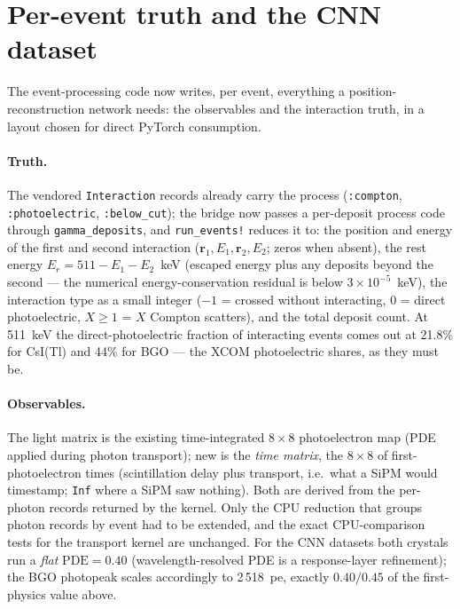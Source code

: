 \documentclass[11pt,a4paper]{article}
\newcommand{\code}[1]{\texttt{#1}}
\newcommand{\csitl}{CsI(Tl)}
\begin{document}
\section{Per-event truth and the CNN dataset}

The event-processing code now writes, per event, everything a position-reconstruction network
needs: the observables and the interaction truth, in a layout chosen for direct
PyTorch consumption.

\paragraph{Truth.} The vendored \code{Interaction} records already carry the process
(\code{:compton}, \code{:photoelectric}, \code{:below\_cut}); the bridge now passes a
per-deposit process code through \code{gamma\_deposits}, and \code{run\_events!}
reduces it to: the position and energy of the first and second interaction
($\mathbf{r}_1, E_1, \mathbf{r}_2, E_2$; zeros when absent), the rest energy
$E_r = 511 - E_1 - E_2$~keV (escaped energy plus any deposits beyond the second ---
the numerical energy-conservation residual is below $3\times10^{-5}$~keV), the interaction type as a small
integer ($-1$ = crossed without interacting, $0$ = direct photoelectric, $X \ge 1$ =
$X$ Compton scatters), and the total deposit count. At 511~keV the direct-photoelectric
fraction of interacting events comes out at 21.8\% for \csitl{} and 44\% for BGO ---
the XCOM photoelectric shares, as they must be.

\paragraph{Observables.} The light matrix is the existing time-integrated $8\times8$
photoelectron map (PDE applied during photon transport); new is the \emph{time matrix},
the $8\times8$ of first-photoelectron times (scintillation delay plus transport, i.e.\
what a SiPM would timestamp; \code{Inf} where a SiPM saw nothing). Both are derived
from the per-photon records returned by the kernel. Only the CPU reduction that groups
photon records by event had to be extended, and the exact CPU-comparison tests for the
transport kernel are unchanged. For the CNN datasets both
crystals run a \emph{flat} $\mathrm{PDE} = 0.40$ (wavelength-resolved PDE is a
response-layer refinement); the BGO photopeak scales accordingly to 2\,518~pe,
exactly $0.40/0.45$ of the first-physics value above.
\end{document}
